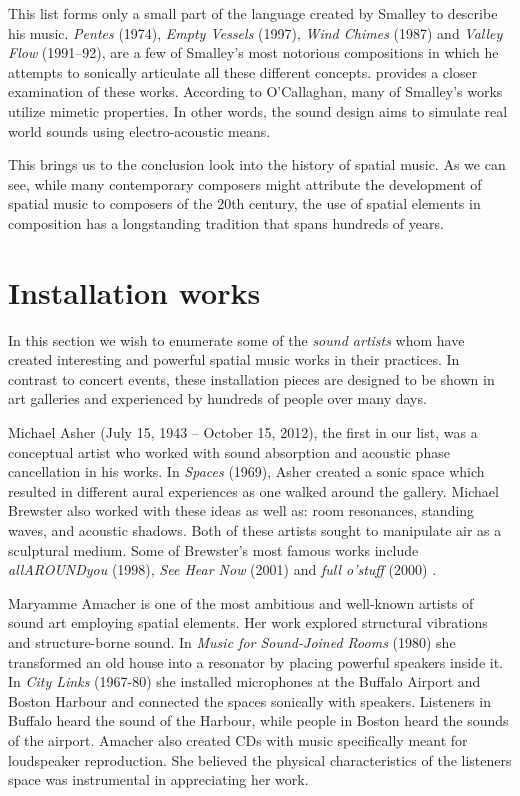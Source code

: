 This list forms only a small part of the language created by Smalley to describe his music. \textit{Pentes} (1974), \textit{Empty Vessels} (1997), \textit{Wind Chimes} (1987) and \textit{Valley Flow} (1991–92), are a few of Smalley's most notorious compositions in which he attempts to sonically articulate all these different concepts. \cite{o2011soundscape} provides a closer examination of these works. According to O'Callaghan, many of Smalley's works utilize mimetic properties. In other words, the sound design aims to simulate real world sounds using electro-acoustic means. 

This brings us to the conclusion look into the history of spatial music. As we can see, while many contemporary composers might attribute the development of spatial music to composers of the 20th century, the use of spatial elements in composition has a longstanding tradition that spans hundreds of years. 


\section{Installation works}

In this section we wish to enumerate some of the \textit{sound artists} whom have created interesting and powerful spatial music works in their practices. In contrast to concert events, these installation pieces are designed to be shown in art galleries and experienced by hundreds of people over many days. 

Michael Asher (July 15, 1943 – October 15, 2012), the first in our list, was a conceptual artist who worked with sound absorption and acoustic phase cancellation in his works. In \textit{Spaces} (1969), Asher created a sonic space which resulted in different aural experiences as one walked around the gallery. Michael Brewster also worked with these ideas as well as: room resonances, standing waves, and acoustic shadows. Both of these artists sought to manipulate air as a sculptural medium. Some of Brewster's most famous works include \textit{allAROUNDyou} (1998), \textit{See Hear Now} (2001) and \textit{full o’stuff} (2000) \cite{macedo2015investigating}. 

Maryamme Amacher is one of the most ambitious and well-known artists of sound art employing spatial elements. Her work explored structural vibrations and structure-borne sound. In \textit{Music for Sound-Joined Rooms} (1980) she transformed an old house into a resonator by placing powerful speakers inside it. In \textit{City Links} (1967-80) she installed microphones at the Buffalo Airport and Boston Harbour and connected the spaces sonically with speakers. Listeners in Buffalo heard the sound of the Harbour, while people in Boston heard the sounds of the airport. Amacher also created CDs with music specifically meant for loudspeaker reproduction. She believed the physical characteristics of the listeners space was instrumental in appreciating her work\cite{ouzounian2008sound}. 

